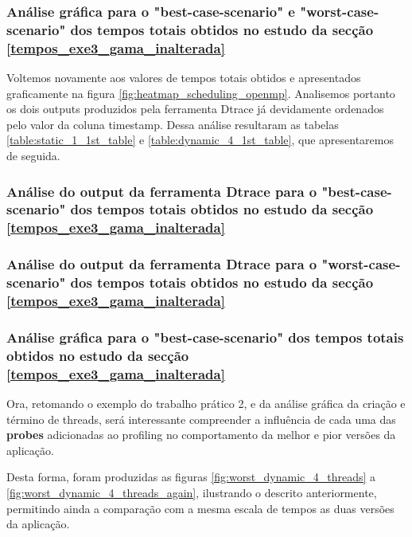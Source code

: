 \documentclass[a4paper]{article}
\begin{document}
\subsubsection{Análise gráfica para o "best-case-scenario" e  "worst-case-scenario" dos tempos totais obtidos no estudo da secção \ref{tempos_exe3_gama_inalterada}}

Voltemos novamente aos valores de tempos totais obtidos e apresentados graficamente na figura \ref{fig:heatmap_scheduling_openmp}. Analisemos portanto os dois outputs produzidos pela ferramenta Dtrace já devidamente ordenados pelo valor da coluna timestamp. Dessa análise resultaram as tabelas \ref{table:static_1_1st_table} e \ref{table:dynamic_4_1st_table}, que apresentaremos de seguida.

\subsubsection{Análise do output da ferramenta Dtrace para o "best-case-scenario" dos tempos totais obtidos no estudo da secção \ref{tempos_exe3_gama_inalterada}}


\subsubsection{Análise do output da ferramenta Dtrace para o "worst-case-scenario" dos tempos totais obtidos no estudo da secção \ref{tempos_exe3_gama_inalterada}}




\subsubsection{Análise gráfica para o "best-case-scenario" dos tempos totais obtidos no estudo da secção \ref{tempos_exe3_gama_inalterada}}

Ora, retomando o exemplo do trabalho prático 2, e da análise gráfica da criação e término de threads, será interessante compreender a influência de cada uma das \textbf{probes} adicionadas ao profiling no comportamento da melhor e pior versões da aplicação. \par
Desta forma, foram produzidas as figuras \ref{fig:worst_dynamic_4_threads} a \ref{fig:worst_dynamic_4_threads_again}, ilustrando o descrito anteriormente, permitindo ainda a comparação com a mesma escala de tempos as duas versões da aplicação.\par 
\end{document}
